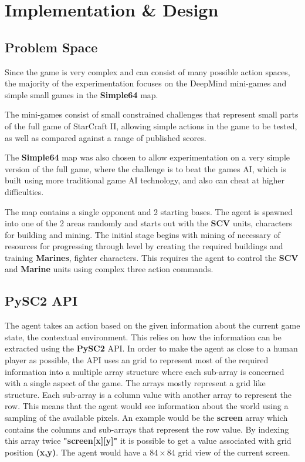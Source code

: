 \chapter{Implementation \& Design}%
\label{implem}

\section{Problem Space}
Since the game is very complex and can consist of many possible action spaces,
the majority of the experimentation focuses on the DeepMind mini-games
and simple small games in the \textbf{Simple64} map.

The mini-games consist of small constrained challenges that represent
small parts of the full game of StarCraft II, allowing simple actions
in the game to be tested, as well as compared against a range of
published scores.

The \textbf{Simple64} map was also chosen to allow experimentation on
a very simple version of the full game, where the challenge is
to beat the games AI, which is built using more traditional game AI
technology, and also can cheat at higher difficulties.

The map contains a single opponent and 2 starting bases.
The agent is spawned into one of the 2 areas randomly and starts out
with the \textbf{SCV} units, characters for building and mining.
The initial stage begins with mining of necessary of resources for progressing
through level by creating the required buildings and training \textbf{Marines}, fighter characters.
This requires the agent to control the \textbf{SCV} and \textbf{Marine} units
using complex three action commands.

\section{PySC2 API}


The agent takes an action based on the given information about the current game
state, the contextual environment.
This relies on how the information can be extracted using the \textbf{PySC2} API\@.
In order to make the agent as close to a human player as possible, the API uses an grid to represent most of the required information into a multiple array structure where each sub-array is concerned with a single aspect of the game. The arrays mostly represent a grid like structure. Each sub-array is a column value with another array to represent the row. This means that the agent would see information about the world using a sampling of the available pixels. An example would be the \textbf{screen} array which contains the columns and sub-arrays that represent the row value. By indexing this array twice \textbf{"screen[x][y]"} it is possible to get a value associated with grid position \textbf{(x,y)}. The agent would have a $84 \times 84$ grid view of the current screen.

